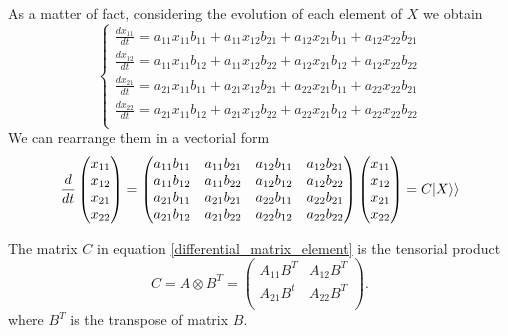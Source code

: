 As a matter of fact, considering the evolution of each element of $X$ we obtain
\begin{equation}
    \left\{\begin{aligned}
        \frac{dx_{11}}{dt} = a_{11}x_{11}b_{11} +a_{11}x_{12}b_{21}+ a_{12}x_{21}b_{11}+ a_{12}x_{22}b_{21}\\
        \frac{dx_{12}}{dt} = a_{11}x_{11}b_{12} +a_{11}x_{12}b_{22}+ a_{12}x_{21}b_{12}+ a_{12}x_{22}b_{22}\\
        \frac{dx_{21}}{dt} = a_{21}x_{11}b_{11} +a_{21}x_{12}b_{21}+ a_{22}x_{21}b_{11}+ a_{22}x_{22}b_{21}\\
        \frac{dx_{22}}{dt} = a_{21}x_{11}b_{12} +a_{21}x_{12}b_{22}+ a_{22}x_{21}b_{12}+ a_{22}x_{22}b_{22}\\
    \end{aligned}\right. 
\end{equation}
We can rearrange them in a vectorial form
\begin{equation}\label{differential_matrix_element}
    \frac{d}{dt}\begin{pmatrix}
        x_{11}\\ x_{12}\\x_{21}\\ x_{22}\\
    \end{pmatrix} = \begin{pmatrix}
        a_{11}b_{11} &a_{11}b_{21}& a_{12}b_{11}& a_{12}b_{21}\\
        a_{11}b_{12} &a_{11}b_{22}& a_{12}b_{12}& a_{12}b_{22}\\
        a_{21}b_{11} &a_{21}b_{21}& a_{22}b_{11}& a_{22}b_{21}\\
        a_{21}b_{12} &a_{21}b_{22}& a_{22}b_{12}& a_{22}b_{22}\\
    \end{pmatrix}\begin{pmatrix}
        x_{11}\\ x_{12}\\ x_{21}\\ x_{22}\\
    \end{pmatrix} = C \lvert X\rangle\rangle
\end{equation}

The matrix $C$ in equation \eqref{differential_matrix_element} is the tensorial product
\begin{equation}
    C= A\otimes B^T = \begin{pmatrix}
        A_{11}B^T & A_{12}B^T\\
        A_{21}B^t& A_{22}B^T\\
    \end{pmatrix}.
\end{equation}
where $B^T$ is the transpose of matrix $B$.

